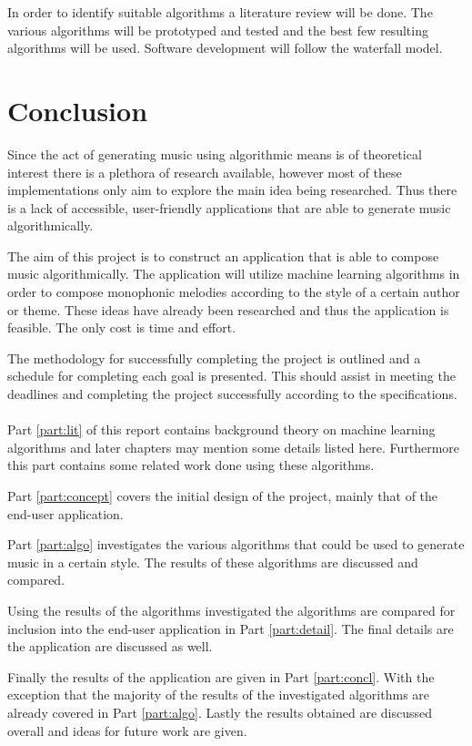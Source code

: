 In order to identify suitable algorithms a literature review will be done. The various algorithms will be prototyped and tested and the best few resulting algorithms will be used. Software development will follow the waterfall model.

\pagebreak
\section{Conclusion}
Since the act of generating music using algorithmic means is of theoretical interest there is a plethora of research available, however most of these implementations only aim to explore the main idea being researched. Thus there is a lack of accessible, user-friendly applications that are able to generate music algorithmically.

The aim of this project is to construct an application that is able to compose music algorithmically. The application will utilize machine learning algorithms in order to compose monophonic melodies according to the style of a certain author or theme. These ideas have already been researched and thus the application is feasible. The only cost is time and effort.

The methodology for successfully completing the project is outlined and a schedule for completing each goal is presented. This should assist in meeting the deadlines and completing the project successfully according to the specifications. 
\\
\\
Part \ref{part:lit} of this report contains background theory on machine learning algorithms and later chapters may mention some details listed here. Furthermore this part contains some related work done using these algorithms.

Part \ref{part:concept} covers the initial design of the project, mainly that of the end-user application. 

Part \ref{part:algo} investigates the various algorithms that could be used to generate music in a certain style. The results of these algorithms are discussed and compared.

Using the results of the algorithms investigated the algorithms are compared for inclusion into the end-user application in Part \ref{part:detail}. The final details are the application are discussed as well.

Finally the results of the application are given in Part \ref{part:concl}. With the exception that the majority of the results of the investigated algorithms are already covered in Part \ref{part:algo}. Lastly the results obtained are discussed overall and ideas for future work are given.